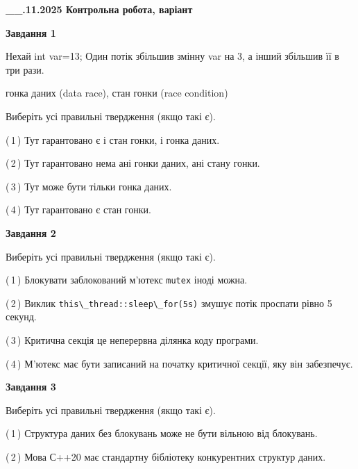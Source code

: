 \documentclass[12pt, ukrainian]{article}
\def\code#1{\Verb!#1!}
\begin{document}
\begin {large}

\textbf{\_\_.11.2025 Контрольна робота, варіант  }\par


{

\begin{center}
\textbf{Завдання 1}
\end{center}
Нехай int var=13; Один потік збільшив змінну var на 3, а інший збільшив її в три рази.

гонка даних (data race), стан гонки (race condition)

Виберіть усі правильні твердження (якщо такі є).\par
\vspace{2mm}
(\,1\,) Тут гарантовано є і стан гонки, і гонка даних.%

(\,2\,) Тут гарантовано нема ані гонки даних, ані стану гонки.%

(\,3\,) Тут може бути тільки гонка даних.%

(\,4\,) Тут гарантовано є стан гонки.%



\begin{center}
\textbf{Завдання 2}
\end{center}
Виберіть усі правильні твердження (якщо такі є).\par
\vspace{2mm}

(\,1\,) Блокувати заблокований м’ютекс  \code{mutex} іноді можна.%

(\,2\,) Виклик \code{this\_thread::sleep\_for(5s)} змушує потік проспати рівно 5 секунд.%

(\,3\,) Критична секція це неперервна ділянка коду програми.%

(\,4\,) М’ютекс має бути записаний на початку критичної секції, яку він забезпечує.%



\begin{center}
\textbf{Завдання 3}
\end{center}
Виберіть усі правильні твердження (якщо такі є).\par
\vspace{2mm}

(\,1\,) Структура даних без блокувань може не бути вільною від блокувань.%

(\,2\,) Мова С++20 має стандартну бібліотеку конкурентних структур даних.%

}
\end{large}
\end{document}
